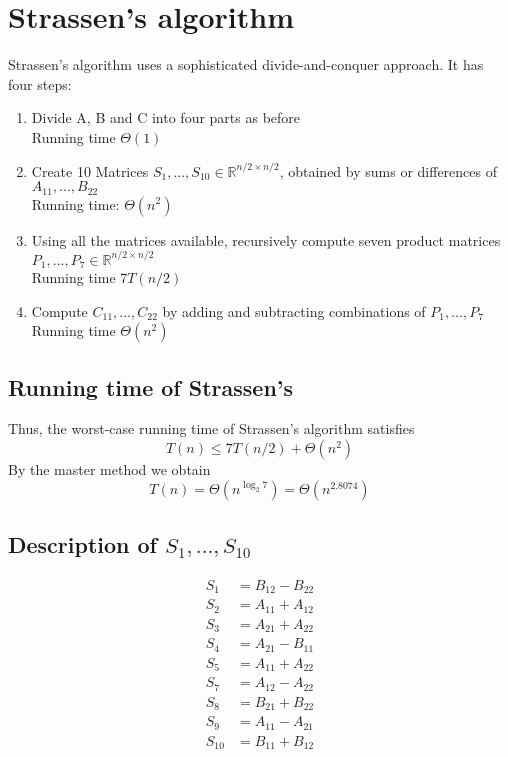 \documentclass{article}[18pt]
\begin{document}
\section{Strassen's algorithm}
Strassen's algorithm uses a sophisticated divide-and-conquer approach. It has four steps:
\begin{enumerate}
	\item Divide A, B and C into four parts as before\\
	Running time $\Theta(1)$
	\item Create 10 Matrices $S_1,...,S_{10}\in \mathbb{R}^{n/2\times n/2}$, obtained by sums or differences of $A_{11},...,B_{22}$\\
	Running time: $\Theta(n^2)$
	\item Using all the matrices available, recursively compute seven product matrices $P_1,...,P_7\in \mathbb{R}^{n/2\times n/2}$\\
	Running time $7T(n/2)$
	\item Compute $C_{11},...,C_{22}$ by adding and subtracting combinations of $P_1,...,P_7$\\
	Running time $\Theta(n^2)$
\end{enumerate}
\subsection{Running time of Strassen's}
Thus, the worst-case running time of Strassen's algorithm satisfies
\[
T(n) \leq 7 T(n / 2)+\Theta\left(n^{2}\right)
\]
By the master method we obtain
\[
T(n)=\Theta\left(n^{\log _{2} 7}\right)=\Theta\left(n^{2.8074}\right)
\]
\subsection{Description of $S_1,...,S_{10}$}
\[
\begin{aligned} S_{1} &=B_{12}-B_{22} \\ S_{2} &=A_{11}+A_{12} \\ S_{3} &=A_{21}+A_{22} \\ S_{4} &=A_{21}-B_{11} \\ S_{5} &=A_{11}+A_{22} \\ S_{7} &=A_{12}-A_{22} \\ S_{8} &=B_{21}+B_{22} \\ S_{9} &=A_{11}-A_{21} \\ S_{10} &=B_{11}+B_{12} \end{aligned}
\]
\end{document}
